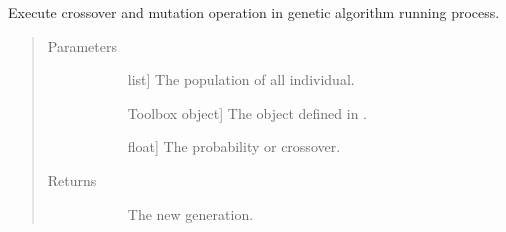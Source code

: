 \documentclass[letterpaper,10pt,english]{sphinxmanual}
\begin{document}
\begin{fulllineitems}
\label{\detokenize{pygace:pygace.ga.gaceVarAnd}}
Execute crossover and mutation operation in genetic algorithm running
process.
\begin{quote}\begin{description}
\item[{Parameters}] \leavevmode\begin{description}
\item[{}] \leavevmode{[}list{]}
The population of all individual.

\item[{}] \leavevmode{[}Toolbox object{]}
The  object defined in .

\item[{}] \leavevmode{[}float{]}
The probability or crossover.

\end{description}

\item[{Returns}] \leavevmode\begin{description}
\item[{}] \leavevmode
The new generation.

\end{description}

\end{description}\end{quote}

\end{fulllineitems}

\end{document}
